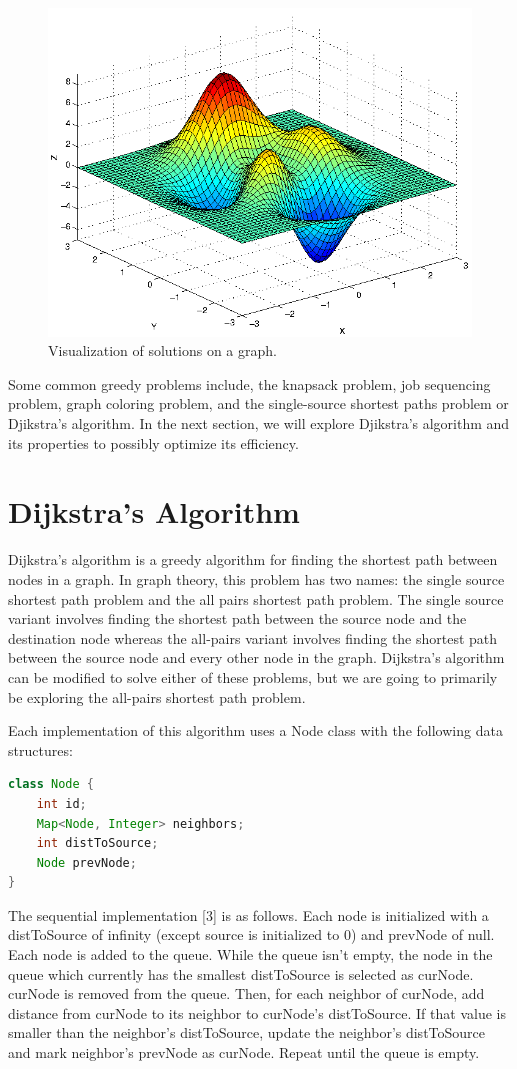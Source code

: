 \documentclass[letterpaper, 10 pt, conference]{ieeeconf}  %
\begin{document}
\begin{figure}
\centering
\includegraphics[width=.4\textwidth]{peaks.png}
\caption{Visualization of solutions on a graph.}
\end{figure}

Some common greedy problems include, the knapsack problem, job sequencing problem, graph coloring problem, and the single-source shortest paths problem or Djikstra’s algorithm. In the next section, we will explore Djikstra’s algorithm and its properties to possibly optimize its efficiency.

\section{Dijkstra's Algorithm}

Dijkstra’s algorithm is a greedy algorithm for finding the shortest path between nodes in a graph. In graph theory, this problem has two names: the single source shortest path problem and the all pairs shortest path problem. The single source variant involves finding the shortest path between the source node and the destination node whereas the all-pairs variant involves finding the shortest path between the source node and every other node in the graph. Dijkstra’s algorithm can be modified to solve either of these problems, but we are going to primarily be exploring the all-pairs shortest path problem.

Each implementation of this algorithm uses a Node class with the following data structures:

\begin{lstlisting}[language=Java]
class Node {
    int id;
    Map<Node, Integer> neighbors;
    int distToSource;
    Node prevNode;
}
\end{lstlisting}

The sequential implementation [3] is as follows. Each node is initialized with a distToSource of infinity (except source is initialized to 0) and prevNode of null. Each node is added to the queue. While the queue isn’t empty, the node in the queue which currently has the smallest distToSource is selected as curNode. curNode is removed from the queue. Then, for each neighbor of curNode, add distance from curNode to its neighbor to curNode’s distToSource. If that value is smaller than the neighbor’s distToSource, update the neighbor’s distToSource and mark neighbor’s prevNode as curNode. Repeat until the queue is empty.
\end{document}
